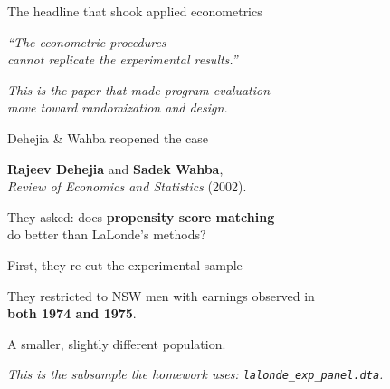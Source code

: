 \documentclass[11pt,aspectratio=169]{beamer}
\begin{document}
\begin{frame}{The headline that shook applied econometrics}
\vspace{1.6em}
\begin{center}
\Large\itshape\color{charcoal}
``The econometric procedures \\[0.2em] cannot replicate the experimental results.''
\end{center}
\vspace{1.4em}
\begin{center}
\small\color{warmgray}\itshape
This is the paper that made program evaluation \\
move toward randomization and design.
\end{center}
\end{frame}


\begin{frame}{Dehejia \& Wahba reopened the case}
\vspace{1em}
\begin{center}
\large
\textbf{Rajeev Dehejia} and \textbf{Sadek Wahba}, \\[0.2em] \textit{Review of Economics and Statistics} (2002).
\end{center}
\vspace{0.8em}
\begin{center}
\large
They asked: \;does \textbf{propensity score matching} \\[0.2em] do better than LaLonde's methods?
\end{center}
\end{frame}

\begin{frame}{First, they re-cut the experimental sample}
\vspace{1em}
\begin{center}
\large
They restricted to NSW men with earnings observed in \\[0.2em] \textbf{both 1974 and 1975}.
\end{center}
\vspace{0.6em}
\begin{center}
\large
A smaller, slightly different population.
\end{center}
\vspace{1em}
\begin{center}
\small\color{warmgray}\itshape
This is the subsample the homework uses: \texttt{lalonde\_exp\_panel.dta}.
\end{center}
\end{frame}
\end{document}
